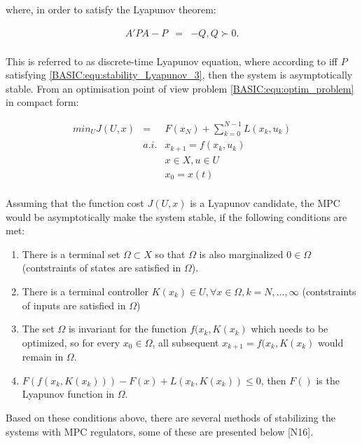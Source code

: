 		where, in order to satisfy the Lyapunov theorem:
		
		\begin{equation}
        \begin{array}{rcl}
				A'PA-P&=&-Q, Q\succ 0.\\
        \end{array}
        \label{BASIC:equ:stability_Lyapunov_3}
    \end{equation}
		
	This is referred to as discrete-time Lyapunov equation, where  according to \cite{borrelli2017predictive} iff $P$ satisfying \ref{BASIC:equ:stability_Lyapunov_3}, then the system is asymptotically stable. From an optimisation point of view problem \ref{BASIC:equ:optim_problem} in compact form:
	
\begin{equation}
        \begin{array}{rcl}
				min_UJ(U,x)&=&F(x_N)+\sum^{N-1}_{k=0}L(x_k,u_k) \\
					&a.i.&x_{k+1}=f(x_k,u_k) \\
					&&x\in X, u\in U\\
					&&x_0=x(t)\\
        \end{array}
        \label{BASIC:equ:optim_stability}
    \end{equation}

Assuming that the function cost $J(U,x)$ is a Lyapunov candidate, the MPC would be asymptotically make the system stable, if the following conditions are met:
\begin{enumerate}
	\item There is a terminal set $\Omega\subset X$ so that $\Omega$ is also marginalized $0\in\Omega$ (contstraints of states are satisfied in $\Omega$).
	\item There is a terminal controller $K(x_k)\in U, \forall x\in\Omega,k=N,\dots,\infty$ (contstraints of inputs are satisfied in $\Omega$)
	\item The set $\Omega$ is invariant for the function $f(x_k,K(x_k)$ which needs to be optimized, so for every $x_0\in\Omega$, all subsequent $x_{k+1}=f(x_k,K(x_k)$ would remain in $\Omega$.
	\item $F(f(x_k,K(x_k)))-F(x)+L(x_k,K(x_k))\leq 0$, then $F()$ is the Lyapunov function in $\Omega$.
\end{enumerate}

Based on these conditions above, there are several methods of stabilizing the systems with MPC regulators, some of these are presented below [N16].

